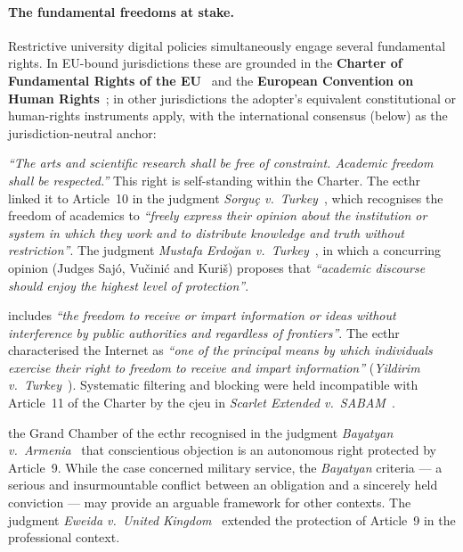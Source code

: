 \paragraph{The fundamental freedoms at stake.}

Restrictive university digital policies simultaneously engage
several fundamental rights. In EU-bound jurisdictions these are
grounded in the \textbf{Charter of Fundamental Rights of the
EU}~\cite{eu-charter} and the \textbf{European Convention on Human
Rights}~\cite{echr}; in other jurisdictions the adopter's equivalent
constitutional or human-rights instruments apply, with the
international consensus (below) as the jurisdiction-neutral anchor:

\begin{description}[style=unboxed]
    \item[Academic freedom (EU Charter, Art.~13):] \emph{``The arts
    and scientific research shall be free of constraint. Academic freedom shall be
    respected.''} This right is self-standing within
    the Charter. The \gls{ecthr} linked it to Article~10 in the judgment
    \emph{Sorgu\c{c} v.\ Turkey}~\cite{sorguc2009}, which recognises the
    freedom of academics to \emph{``freely express their opinion
    about the institution or system in which they work and to distribute
    knowledge and truth without restriction''}. The judgment
    \emph{Mustafa Erdo\u{g}an v.\ Turkey}~\cite{erdogan2014},
    in which a concurring opinion (Judges Saj\'o, Vu\v{c}ini\'c
    and Kuri\v{s}) proposes that \emph{``academic discourse should
    enjoy the highest level of protection''}.

    \item[Freedom of expression and information (EU Charter, Art.~11;
    ECHR, Art.~10):] includes \emph{``the freedom to receive or
    impart information or ideas without interference by
    public authorities and regardless of frontiers''}. The \gls{ecthr}
    characterised the Internet as \emph{``one of the principal means by
    which individuals exercise their right to freedom to receive
    and impart information''} (\emph{Yildirim v.\
    Turkey}~\cite{yildirim2012}). Systematic filtering and blocking
    were held incompatible with Article~11 of the
    Charter by the \gls{cjeu} in \emph{Scarlet Extended v.\
    SABAM}~\cite{scarlet2011}.

    \item[Freedom of thought and conscience (EU Charter, Art.~10;
    ECHR, Art.~9):] the Grand Chamber of the \gls{ecthr} recognised in
    the judgment \emph{Bayatyan v.\ Armenia}~\cite{bayatyan2011} that
    conscientious objection is an autonomous right protected by
    Article~9. While the case concerned military service, the
    \emph{Bayatyan} criteria --- a serious and insurmountable conflict
    between an obligation and a sincerely held conviction --- may
    provide an arguable framework for other contexts. The judgment
    \emph{Eweida v.\ United Kingdom}~\cite{eweida2013} extended the
    protection of Article~9 in the professional context.


\end{description}
